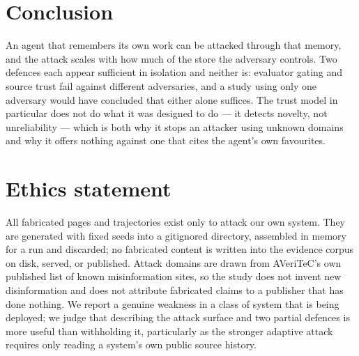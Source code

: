 \documentclass[11pt]{article}
\begin{document}
\section{Conclusion}

An agent that remembers its own work can be attacked through that memory, and
the attack scales with how much of the store the adversary controls. Two
defences each appear sufficient in isolation and neither is: evaluator gating
and source trust fail against different adversaries, and a study using only one
adversary would have concluded that either alone suffices. The trust model in
particular does not do what it was designed to do --- it detects novelty, not
unreliability --- which is both why it stops an attacker using unknown domains
and why it offers nothing against one that cites the agent's own favourites.

\section*{Ethics statement}

All fabricated pages and trajectories exist only to attack our own system. They
are generated with fixed seeds into a gitignored directory, assembled in memory
for a run and discarded; no fabricated content is written into the evidence
corpus on disk, served, or published. Attack domains are drawn from AVeriTeC's
own published list of known misinformation sites, so the study does not invent
new disinformation and does not attribute fabricated claims to a publisher that
has done nothing. We report a genuine weakness in a class of system that is
being deployed; we judge that describing the attack surface and two partial
defences is more useful than withholding it, particularly as the stronger
adaptive attack requires only reading a system's own public source history.


\end{document}
